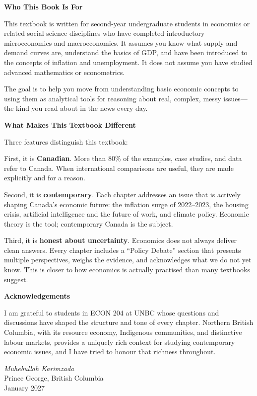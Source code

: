 \documentclass[12pt,twoside,openright]{book}
\theoremstyle{definition}
\begin{document}
\vspace{10pt}
\noindent\textbf{Who This Book Is For}

This textbook is written for second-year undergraduate students in economics or related social
science disciplines who have completed introductory microeconomics and macroeconomics. It
assumes you know what supply and demand curves are, understand the basics of GDP, and have
been introduced to the concepts of inflation and unemployment. It does not assume you have
studied advanced mathematics or econometrics.

The goal is to help you move from understanding basic economic concepts to using them as
analytical tools for reasoning about real, complex, messy issues---the kind you read about in
the news every day.

\vspace{10pt}
\noindent\textbf{What Makes This Textbook Different}

Three features distinguish this textbook:

First, it is \textbf{Canadian}. More than 80\% of the examples, case studies, and data refer to
Canada. When international comparisons are useful, they are made explicitly and for a reason.

Second, it is \textbf{contemporary}. Each chapter addresses an issue that is actively shaping
Canada's economic future: the inflation surge of 2022--2023, the housing crisis, artificial
intelligence and the future of work, and climate policy. Economic theory is the tool;
contemporary Canada is the subject.

Third, it is \textbf{honest about uncertainty}. Economics does not always deliver clean answers.
Every chapter includes a ``Policy Debate'' section that presents multiple perspectives, weighs
the evidence, and acknowledges what we do not yet know. This is closer to how economics is
actually practised than many textbooks suggest.

\vspace{10pt}
\noindent\textbf{Acknowledgements}

I am grateful to students in ECON 204 at UNBC whose questions and discussions have shaped
the structure and tone of every chapter. Northern British Columbia, with its resource economy,
Indigenous communities, and distinctive labour markets, provides a uniquely rich context
for studying contemporary economic issues, and I have tried to honour that richness throughout.

\vspace{10pt}
\hfill\textit{Muhebullah Karimzada}\\
\hfill Prince George, British Columbia\\
\hfill January 2027
\end{document}
